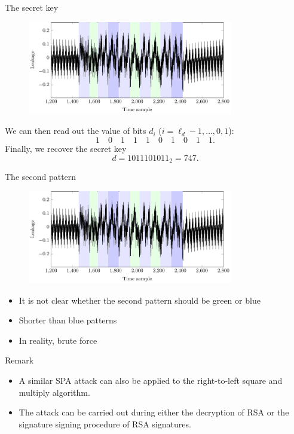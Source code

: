 \begin{frame}{The secret key}
    \begin{figure}[H]
    \centering
    \includegraphics[width=0.8\textwidth]{fig/SPA_on_RSA_highlighted_peaks.pdf}
\end{figure}
We can then read out the value of bits $d_i$ ($i=\ell_d-1,\dots,0,1$):
\[
1\quad 0\quad 1\quad 1\quad 1\quad 0\quad 1\quad 0\quad 1\quad 1.
\]
Finally, we recover the secret key
\[
d=1011101011_2=747.
\]
\end{frame}

\begin{frame}{The second pattern}
\begin{figure}[H]
    \centering
    \includegraphics[width=0.8\textwidth]{fig/SPA_on_RSA_highlighted_peaks.pdf}
\end{figure}
    \begin{itemize}
        \item It is not clear whether the second pattern should be green or blue
        \item Shorter than blue patterns
        \item In reality, brute force
    \end{itemize}
\end{frame}

\begin{frame}{Remark}
    \begin{itemize}
        \item A similar SPA attack can also be applied to the right-to-left square and multiply algorithm.
        \item The attack can be carried out during either the decryption of RSA or the signature signing procedure of RSA signatures.
    \end{itemize}
\end{frame}